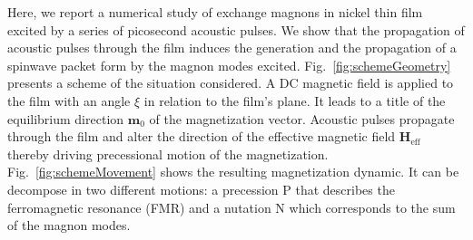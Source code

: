 \documentclass[%
superscriptaddress,
preprint,
showpacs,
amsmath,
amssymb,
aps,
prl,
]{revtex4-1}
\begin{document}
Here, we report a numerical study of exchange magnons in nickel thin film excited by a series of picosecond acoustic pulses.
We show that the propagation of acoustic pulses through the film induces the generation and the propagation of a spinwave packet form by the magnon modes excited.
Fig.~\ref{fig:schemeGeometry} presents a scheme of the situation considered.
A DC magnetic field is applied to the film with an angle $\xi$ in relation to the film's plane.
It leads to a title of the equilibrium direction $\mathbf{m}_0$ of the magnetization vector.
Acoustic pulses propagate through the film and alter the direction of the effective magnetic field $\mathbf{H}_{\mathrm{eff}}$ thereby driving precessional motion of the magnetization.
Fig.~\ref{fig:schemeMovement} shows the resulting magnetization dynamic.
It can be decompose in two different motions: a precession P that describes the ferromagnetic resonance (FMR) and a nutation N which corresponds to the sum of the magnon modes.
\end{document}
